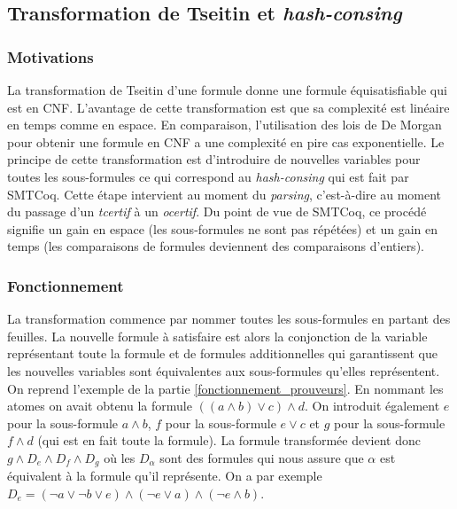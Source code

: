 \documentclass[11pt]{article}
\begin{document}
\subsection{Transformation de Tseitin et \textit{hash-consing}} \label{tseitin}

\subsubsection{Motivations}

La transformation de Tseitin d'une formule donne une formule équisatisfiable qui est en CNF. L'avantage de cette transformation est que sa complexité est linéaire en temps comme en espace. En comparaison, l'utilisation des lois de De Morgan pour obtenir une formule en CNF a une complexité en pire cas exponentielle. Le principe de cette transformation est d'introduire de nouvelles variables pour toutes les sous-formules ce qui correspond au \textit{hash-consing} qui est fait par SMTCoq. Cette étape intervient au moment du \textit{parsing}, c'est-à-dire au moment du passage d'un \textit{tcertif} à un \textit{ocertif}. Du point de vue de SMTCoq, ce procédé signifie un gain en espace (les sous-formules ne sont pas répétées) et un gain en temps (les comparaisons de formules deviennent des comparaisons d'entiers).


\subsubsection{Fonctionnement}

La transformation commence par nommer toutes les sous-formules en partant des feuilles. La nouvelle formule à satisfaire est alors la conjonction de la variable représentant toute la formule et de formules additionnelles qui garantissent que les nouvelles variables sont équivalentes aux sous-formules qu'elles représentent. \\

On reprend l'exemple de la partie \ref{fonctionnement_prouveurs}. En nommant les atomes on avait obtenu la formule $((a \wedge b) \vee c) \wedge d$. On introduit également $e$ pour la sous-formule $a \wedge b$, $f$ pour la sous-formule $e \vee c$ et $g$ pour la sous-formule $f \wedge d$ (qui est en fait toute la formule). La formule transformée devient donc $g \wedge D_e \wedge D_f \wedge D_g$ où les $D_\alpha$ sont des formules qui nous assure que $\alpha$ est équivalent à la formule qu'il représente. On a par exemple $D_e = (\neg a \vee \neg b \vee e) \wedge (\neg e \vee a) \wedge (\neg e \wedge b)$. \\
\end{document}
